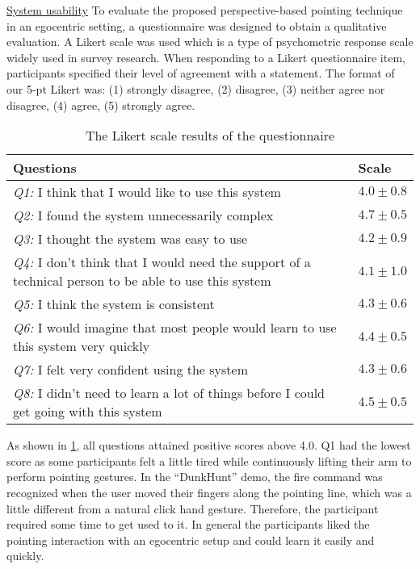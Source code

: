 \underline{System usability} To evaluate the proposed perspective-based pointing technique in an egocentric setting, a questionnaire was designed to obtain a qualitative evaluation. A Likert scale was used which is a type of psychometric response scale widely used in survey research. When responding to a Likert questionnaire item, participants specified their level of agreement with a statement. The format of our 5-pt Likert was: (1) strongly disagree, (2) disagree, (3) neither agree nor disagree, (4) agree, (5) strongly agree. 
\begin{table}
	\caption{The Likert scale results of the questionnaire}
	\label{tb:4-pAST:questionnaire}
	\scriptsize
	\begin{center}
		\begin{tabular}{p{5.5cm}|p{1.2cm}}
			Questions & Scale \\
			\hline
			\textit{Q1:} I think that I would like to use this system &  $4.0\pm0.8$ \\
			\textit{Q2:} I found the system unnecessarily complex & $4.7\pm0.5$ \\
			\textit{Q3:} I thought the system was easy to use & $4.2\pm0.9$ \\
			\textit{Q4:} I don't think that I would need the support of a technical person to be able to use this system & $4.1\pm1.0$\\
			\textit{Q5:} I think the system is consistent & $4.3\pm0.6$ \\
			\textit{Q6:} I would imagine that most people would learn to use this system very quickly & $4.4\pm0.5$ \\
			\textit{Q7:} I felt very confident using the system & $4.3\pm0.6$ \\
			\textit{Q8:} I didn't need to learn a lot of things before I could get going with this system & $4.5\pm0.5$
		\end{tabular}
	\end{center}
\end{table}
As shown in \tablename{ \ref{tb:4-pAST:questionnaire}}, all questions attained positive scores above 4.0. Q1 had the lowest score as some participants felt a little tired while continuously lifting their arm to perform pointing gestures. In the ``DunkHunt'' demo, the fire command was recognized when the user moved their fingers along the pointing line, which was a little different from a natural click hand gesture. Therefore, the participant required some time to get used to it. In general the participants liked the pointing interaction with an egocentric setup and could learn it easily and quickly.

